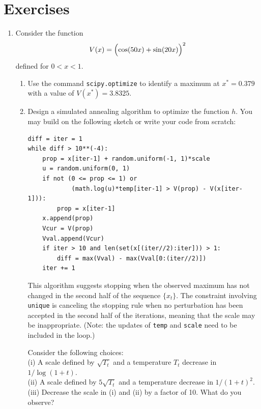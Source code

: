 
\section{Exercises}
\label{sec:7.4}

\begin{enumerate}

\item[7.1] Consider the function
\[
  V(x) = \Bigl(\cos(50x) + \sin(20x)\Bigr)^2
\]
defined for $0 < x < 1$.
\begin{enumerate}
  \item Use the command \texttt{scipy.optimize} to identify a maximum at $x^* = 0.379$ with a
    value of $V(x^*) = 3.8325$.
  \item Design a simulated annealing algorithm to optimize the function $h$. You may build on
    the following sketch or write your code from scratch:
\begin{verbatim}
diff = iter = 1
while diff > 10**(-4):
    prop = x[iter-1] + random.uniform(-1, 1)*scale
    u = random.uniform(0, 1)
    if not (0 <= prop <= 1) or
            (math.log(u)*temp[iter-1] > V(prop) - V(x[iter-1])):
        prop = x[iter-1]
    x.append(prop)
    Vcur = V(prop)
    Vval.append(Vcur)
    if iter > 10 and len(set(x[(iter//2):iter])) > 1:
        diff = max(Vval) - max(Vval[0:(iter//2)])
    iter += 1
\end{verbatim}
    This algorithm suggests stopping when the observed maximum has not changed in the second
    half of the sequence $\{x_t\}$. The constraint involving \texttt{unique} is canceling the
    stopping rule when no perturbation has been accepted in the second half of the iterations,
    meaning that the scale may be inappropriate. (Note: the updates of \texttt{temp} and
    \texttt{scale} need to be included in the loop.)

    Consider the following choices:\\
    (i) A scale defined by $\sqrt{T_t}$ and a temperature $T_t$ decrease in $1/\log(1+t)$.\\
    (ii) A scale defined by $5\sqrt{T_t}$ and a temperature decrease in $1/(1+t)^2$.\\
    (iii) Decrease the scale in (i) and (ii) by a factor of 10. What do you observe?
\end{enumerate}


\end{enumerate}

